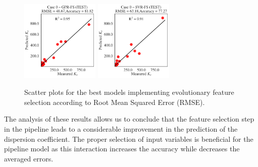 \documentclass[a4paper,12pt, english]{article}
\begin{document}
\begin{figure}[!] \centering 
 \includegraphics[width=0.33245\textwidth]{./scatter/eml____300dpi_scatter_best_model___gpr_fs__case_0__test}
 \includegraphics[width=0.33245\textwidth]{./scatter/eml____300dpi_scatter_best_model___svr_fs__case_0__test}
 \caption{\label{fig:eml____300dpi_scatter_best_model_fs___ldc}
 Scatter plots for the best models implementing evolutionary feature selection according to Root Mean Squared Error (RMSE).}
\end{figure}

The analysis of these results allows us to conclude that the feature selection step in the pipeline leads to a considerable improvement in the prediction of the dispersion coefficient. The proper selection of input variables is beneficial for the pipeline model as this interaction increases the accuracy while decreases the averaged errors.
\end{document}
